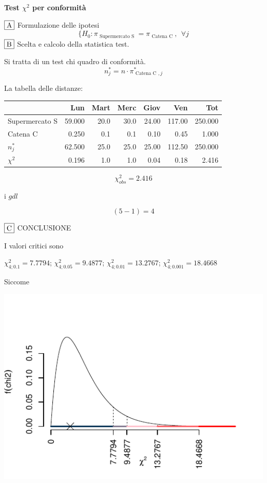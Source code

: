 \documentclass[
  11pt,
]{book}
\theoremstyle{mytheoremstyle}
\theoremstyle{mydefstyle}
\newenvironment{sol}
  {
  \begin{tcolorbox}[enhanced,breakable,arc=0.1mm,boxrule=1pt,colback=white,colframe=iblue,
  title=\bf \fontfamily{lmss}\selectfont \hspace{.5 cm} Soluzione,drop fuzzy shadow]

}{
\end{tcolorbox}
  }
\begin{document}
\begin{sol}
\textbf{Test \(\chi^2\) per conformità}

\(\fbox{A}\) Formulazione delle ipotesi
\[
\{H_0:\pi_\text{ Supermercato S }= \pi_\text{ Catena C },~~\forall j
\]
\(\fbox{B}\) Scelta e calcolo della statistica test.

Si tratta di un test chi quadro di conformità.
\[
n^*_j = n\cdot \pi^*_{\text{ Catena C },j} 
\]

La tabella delle distanze:

\begin{table}[H]
\centering
\begin{tabular}{lrrrrrr}
\toprule
  & Lun & Mart & Merc & Giov & Ven & Tot\\
\midrule
Supermercato S & 59.000 & 20.0 & 30.0 & 24.00 & 117.00 & 250.000\\
Catena C & 0.250 & 0.1 & 0.1 & 0.10 & 0.45 & 1.000\\
$n_j^*$ & 62.500 & 25.0 & 25.0 & 25.00 & 112.50 & 250.000\\
$\chi^2$ & 0.196 & 1.0 & 1.0 & 0.04 & 0.18 & 2.416\\
\bottomrule
\end{tabular}
\end{table}

\[
    \chi^2_{obs}= 2.416 
  \]

i \(gdl\)

\[
    ( 5 -1)= 4 
  \]

\(\fbox{C}\) CONCLUSIONE

I valori critici sono

\(\chi^2_{4;0.1}=7.7794\); \(\chi^2_{4;0.05}=9.4877\); \(\chi^2_{4;0.01}=13.2767\); \(\chi^2_{4;0.001}=18.4668\)

Siccome

\begin{center}\includegraphics{Esami_passati_con_soluzioni_files/figure-latex/2022-13-1} \end{center}


\end{sol}
\end{document}
